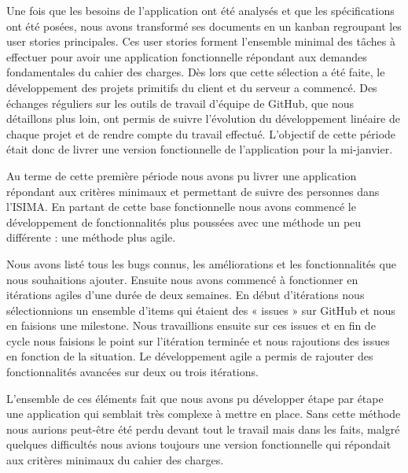     Une fois que les besoins de l’application ont été analysés et que les spécifications ont été posées, nous avons transformé ses documents en un kanban regroupant les user stories principales. Ces user stories forment l’ensemble minimal des tâches à effectuer pour avoir une application fonctionnelle répondant aux demandes fondamentales du cahier des charges. Dès lors que cette sélection a été faite, le développement des projets primitifs du client et du serveur a commencé. Des échanges réguliers sur les outils de travail d’équipe de GitHub, que nous détaillons plus loin, ont permis de suivre l’évolution du développement linéaire de chaque projet et de rendre compte du travail effectué. L’objectif de cette période était donc de livrer une version fonctionnelle de l’application pour la mi-janvier.

    Au terme de cette première période nous avons pu livrer une application répondant aux critères minimaux et permettant de suivre des personnes dans l’ISIMA. En partant de cette base fonctionnelle nous avons commencé le développement de fonctionnalités plus poussées avec une méthode un peu différente : une méthode plus agile.

    Nous avons listé tous les bugs connus, les améliorations et les fonctionnalités que nous souhaitions ajouter. Ensuite nous avons commencé à fonctionner en itérations agiles d’une durée de deux semaines. En début d’itérations nous sélectionnions un ensemble d’items qui étaient des « issues » sur GitHub et nous en faisions une milestone. Nous travaillions ensuite sur ces issues et en fin de cycle nous faisions le point sur l’itération terminée et nous rajoutions des issues en fonction de la situation. Le développement agile a permis de rajouter des fonctionnalités avancées sur deux ou trois itérations.

    L’ensemble de ces éléments fait que nous avons pu développer étape par étape une application qui semblait très complexe à mettre en place. Sans cette méthode nous aurions peut-être été perdu devant tout le travail mais dans les faits, malgré quelques difficultés nous avions toujours une version fonctionnelle qui répondait aux critères minimaux du cahier des charges.